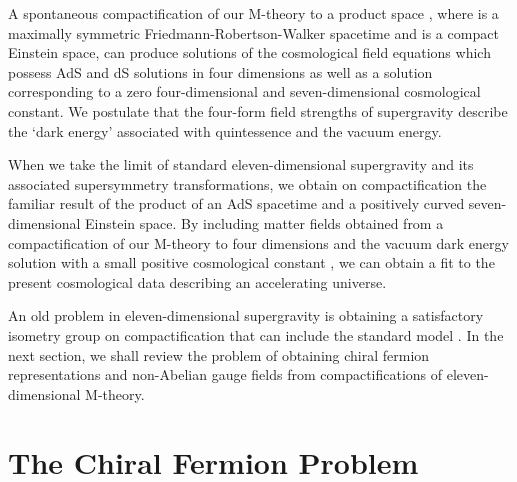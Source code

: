 \documentclass[a4paper,12pt]{article}
\begin{document}
A spontaneous compactification of our M-theory to a product space
\coordHE{}, where \coordHE{} is a maximally symmetric
Friedmann-Robertson-Walker spacetime and \coordHE{} is a compact
Einstein space, can produce solutions of the cosmological field
equations which possess AdS and dS
solutions in four dimensions as well as a solution corresponding
to a zero four-dimensional and seven-dimensional cosmological
constant. We postulate that the four-form field
strengths of supergravity describe the `dark energy' associated with quintessence
and the vacuum energy.

When we take the limit of standard
eleven-dimensional supergravity and its associated supersymmetry
transformations, we obtain on compactification the familiar
result of the product of an AdS spacetime and a positively
curved seven-dimensional Einstein space. By including matter fields obtained from a
compactification of our M-theory to four dimensions and the vacuum dark energy
solution with a small positive cosmological constant \coordHE{}, we can obtain a fit
to the present cosmological data describing an accelerating universe.

An old problem in eleven-dimensional supergravity is
obtaining a satisfactory isometry group on compactification
that can include the standard model \coordHE{}. In the next section, we shall review the problem of obtaining chiral fermion
representations and non-Abelian gauge fields from compactifications of
eleven-dimensional M-theory.

\section{\bf The Chiral Fermion Problem}
\end{document}
